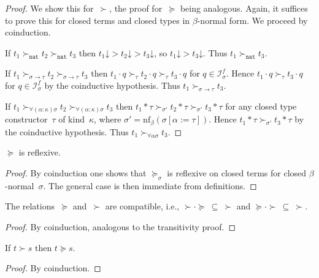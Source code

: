 \documentclass[a4paper,UKenglish,cleveref,autoref,numberwithinsect]{lipics-v2019}
\theoremstyle{definition}
\newcommand{\Iterms}{\mathcal{I}}
\newcommand{\arrtype}{\rightarrow}
\newcommand{\app}[2]{#1 \cdot #2}
\newcommand{\tapp}[2]{#1 * #2}
\newcommand{\subst}[2]{#1:=#2}
\newcommand{\nat}{\mathtt{nat}}
\newcommand{\nf}{\mathrm{nf}}
\newcommand{\da}{\mathord{\downarrow}}
\begin{document}
\begin{proof}
  We show this for~$\succ$, the proof for~$\succeq$ being
  analogous. Again, it suffices to prove this for closed terms and
  closed types in $\beta$-normal form. We proceed by coinduction.

  If $t_1 \succ_\nat t_2 \succ_\nat t_3$ then $t_1\da > t_2\da >
  t_3\da$, so $t_1\da > t_3\da$. Thus $t_1 \succ_\nat t_3$.

  If $t_1 \succ_{\sigma\arrtype\tau}t_2\succ_{\sigma\arrtype\tau}t_3$
  then $\app{t_1}{q}\succ_{\tau}\app{t_2}{q}\succ_\tau\app{t_3}{q}$
  for $q \in \Iterms^f_\sigma$. Hence
  $\app{t_1}{q}\succ_\tau\app{t_3}{q}$ for $q \in \Iterms^f_\sigma$ by
  the coinductive hypothesis. Thus $t_1\succ_{\sigma\arrtype\tau}
  t_3$.

  If $t_1
  \succ_{\forall(\alpha:\kappa)\sigma}t_2\succ_{\forall(\alpha:\kappa)\sigma}t_3$
  then
  $\tapp{t_1}{\tau}\succ_{\sigma'}\tapp{t_2}{\tau}\succ_{\sigma'}\tapp{t_3}{\tau}$
  for any closed type constructor~$\tau$ of kind~$\kappa$, where
  $\sigma' = \nf_\beta(\sigma[\subst{\alpha}{\tau}])$. Hence
  $\tapp{t_1}{\tau}\succ_{\sigma'}\tapp{t_3}{\tau}$ by the coinductive
  hypothesis. Thus $t_1\succ_{\forall\alpha\sigma} t_3$.
\end{proof}

\begin{lemma}\label{lem_reflexive}
  $\succeq$ is reflexive.
\end{lemma}

\begin{proof}
  By coinduction one shows that $\succeq_\sigma$ is reflexive on
  closed terms for closed $\beta$-normal~$\sigma$. The general case is
  then immediate from definitions.
\end{proof}

\begin{lemma}\label{lem:compatibility}
  The relations~$\succeq$ and~$\succ$ are compatible, i.e., $\succ
  \cdot \succeq\ \subseteq\ \succ$ and $\succeq \cdot
  \succ\ \subseteq\ \succ$.
\end{lemma}

\begin{proof}
  By coinduction, analogous to the transitivity proof.
\end{proof}

\begin{lemma}\label{lem_succ_to_succeq}
  If $t \succ s$ then $t \succeq s$.
\end{lemma}

\begin{proof}
  By coinduction.
\end{proof}
\end{document}
